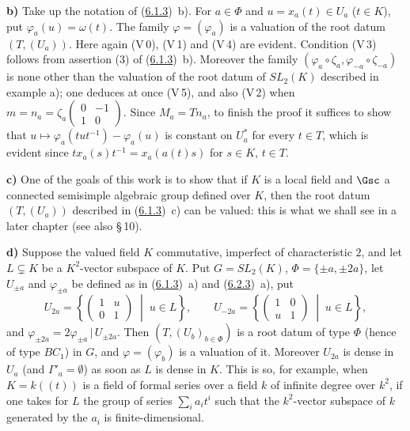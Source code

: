 \documentclass[12pt,a4paper,oneside,english]{smfart}
\newcommand{\btref}[1]{\hyperlink{bt:#1}{#1}}
\theoremstyle{definition}
\theoremstyle{bt}
\begin{document}
\medskip
\noindent\textbf{b)} Take up the notation of (\btref{6.1.3})~b). For $a\in\Phi$ and
$u=x_a(t)\in U_a$ ($t\in K$), put $\varphi_a(u)=\omega(t)$. The family
$\varphi=(\varphi_a)$ is a valuation of the root datum $(T,(U_a))$. Here again
(V\,0), (V\,1) and (V\,4) are evident. Condition (V\,3) follows from assertion
(3) of (\btref{6.1.3})~b). Moreover the family
$(\varphi_a\circ\zeta_a,\varphi_{-a}\circ\zeta_{-a})$ is none other than the
valuation of the root datum of $SL_2(K)$ described in example a); one deduces at
once (V\,5), and also (V\,2) when
$m=n_a=\zeta_a\!\left(\begin{smallmatrix}0&-1\\1&0\end{smallmatrix}\right)$.
Since $M_a=Tn_a$, to finish the proof it suffices to show that
$u\mapsto\varphi_a(tut^{-1})-\varphi_a(u)$ is constant on $U_a^{*}$ for every
$t\in T$, which is evident since $tx_a(s)t^{-1}=x_a(a(t)s)$ for $s\in K$,
$t\in T$.

\medskip
\noindent\textbf{c)} One of the goals of this work is to show that if $K$ is a
local field and $\Gsc$ a connected semisimple algebraic group defined over $K$,
then the root datum $(T,(U_a))$ described in (\btref{6.1.3})~c) can be valued: this is
what we shall see in a later chapter (see also \S\,10).

\medskip
\noindent\textbf{d)} Suppose the valued field $K$ commutative, imperfect of
characteristic $2$, and let $L\subsetneq K$ be a $K^{2}$-vector subspace of $K$.
Put $G=SL_2(K)$, $\Phi=\{\pm a,\pm 2a\}$, let $U_{\pm a}$ and $\varphi_{\pm a}$
be defined as in (\btref{6.1.3})~a) and (\btref{6.2.3})~a), put
\[ U_{2a}=\left\{\begin{pmatrix}1&u\\0&1\end{pmatrix}\;\middle|\;u\in L\right\},\qquad
   U_{-2a}=\left\{\begin{pmatrix}1&0\\u&1\end{pmatrix}\;\middle|\;u\in L\right\}, \]
and $\varphi_{\pm2a}=2\varphi_{\pm a}\,|\,U_{\pm2a}$. Then $(T,(U_b)_{b\in\Phi})$
is a root datum of type $\Phi$ (hence of type $BC_1$) in $G$, and
$\varphi=(\varphi_b)$ is a valuation of it. Moreover $U_{2a}$ is dense in $U_a$
(and $\Gamma'_a=\emptyset$) as soon as $L$ is dense in $K$. This is so, for
example, when $K=k((t))$ is a field of formal series over a field $k$ of infinite
degree over $k^{2}$, if one takes for $L$ the group of series $\sum_i a_it^{i}$
such that the $k^{2}$-vector subspace of $k$ generated by the $a_i$ is
finite-dimensional.
\end{document}

